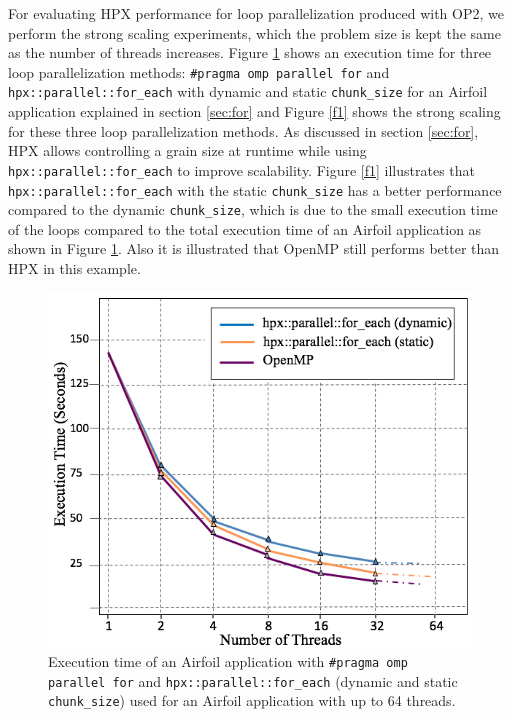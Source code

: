 \documentclass[conference]{IEEEtran}
\begin{document}
 

For evaluating HPX performance for loop parallelization produced with OP2, we perform the strong scaling experiments, which the problem size is kept the same as the number of threads increases. Figure \ref{f1b} shows an execution time for three loop parallelization methods: \texttt{\#pragma omp parallel for} and \texttt{hpx::parallel::for\_each} with dynamic and static \texttt{chunk\_size} for an Airfoil application explained in section \ref{sec:for} and Figure \ref{f1} shows the strong scaling for these three loop parallelization methods. As discussed in section \ref{sec:for}, HPX allows controlling a grain size at runtime while using \texttt{hpx::parallel::for\_each} to improve scalability. Figure \ref{f1} illustrates that \texttt{hpx::parallel::for\_each} with the static \texttt{chunk\_size} has a better performance compared to the dynamic \texttt{chunk\_size}, which is due to the small execution time of the loops compared to the total execution time of an Airfoil application as shown in Figure \ref{f1b}. Also it is illustrated that OpenMP still performs better than HPX in this example.

\begin{figure} 
\begin{center}
\centering
\includegraphics[width=1\columnwidth]{Pictures/parallel_for_each2.jpg}
\caption {\small{Execution time of an Airfoil application with \texttt{\#pragma omp parallel for} and \texttt{hpx::parallel::for\_each} (dynamic and static \texttt{chunk\_size}) used for an Airfoil application
with up to 64 threads.}}
\label{f1b}
\end{center}
\end{figure}
\end{document}
